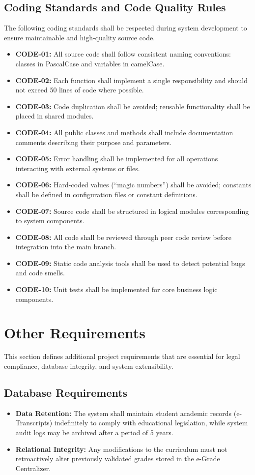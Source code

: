 \documentclass[11pt, a4paper]{article}
\begin{document}
\subsection{Coding Standards and Code Quality Rules}
The following coding standards shall be respected during system development to ensure maintainable and high-quality source code.
\begin{itemize}
    \item \textbf{CODE-01:} All source code shall follow consistent naming conventions: classes in PascalCase and variables in camelCase.
    \item \textbf{CODE-02:} Each function shall implement a single responsibility and should not exceed 50 lines of code where possible.
    \item \textbf{CODE-03:} Code duplication shall be avoided; reusable functionality shall be placed in shared modules.
    \item \textbf{CODE-04:} All public classes and methods shall include documentation comments describing their purpose and parameters.
    \item \textbf{CODE-05:} Error handling shall be implemented for all operations interacting with external systems or files.
    \item \textbf{CODE-06:} Hard-coded values (``magic numbers'') shall be avoided; constants shall be defined in configuration files or constant definitions.
    \item \textbf{CODE-07:} Source code shall be structured in logical modules corresponding to system components.
    \item \textbf{CODE-08:} All code shall be reviewed through peer code review before integration into the main branch.
    \item \textbf{CODE-09:} Static code analysis tools shall be used to detect potential bugs and code smells.
    \item \textbf{CODE-10:} Unit tests shall be implemented for core business logic components.
\end{itemize}


\section{Other Requirements}
This section defines additional project requirements that are essential for legal compliance, database integrity, and system extensibility.

\subsection{Database Requirements}
\begin{itemize}
    \item \textbf{Data Retention:} The system shall maintain student academic records (e-Transcripts) indefinitely to comply with educational legislation, while system audit logs may be archived after a period of 5 years.
    \item \textbf{Relational Integrity:} Any modifications to the curriculum must not retroactively alter previously validated grades stored in the e-Grade Centralizer.
\end{itemize}
\end{document}

